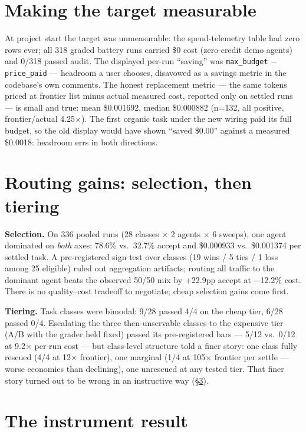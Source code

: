 \documentclass{article}
\begin{document}
\section{Making the target measurable}

At project start the target was unmeasurable: the spend-telemetry table had zero rows ever; all 318 graded battery runs carried \$0 cost (zero-credit demo agents) and 0/318 passed audit. The displayed per-run ``saving'' was \texttt{max\_budget} $-$ \texttt{price\_paid} --- headroom a user chooses, disavowed as a savings metric in the codebase's own comments. The honest replacement metric --- the same tokens priced at frontier list minus actual measured cost, reported only on settled runs --- is small and true: mean \$0.001692, median \$0.000882 (n=132, all positive, frontier/actual 4.25$\times$). The first organic task under the new wiring paid its full budget, so the old display would have shown ``saved \$0.00'' against a measured \$0.0018: headroom errs in both directions.

\section{Routing gains: selection, then tiering}

\textbf{Selection.} On 336 pooled runs (28 classes $\times$ 2 agents $\times$ 6 sweeps), one agent dominated on \emph{both} axes: 78.6\% vs.\ 32.7\% accept and \$0.000933 vs.\ \$0.001374 per settled task. A pre-registered sign test over classes (19 wins / 5 ties / 1 loss among 25 eligible) ruled out aggregation artifacts; routing all traffic to the dominant agent beats the observed 50/50 mix by +22.9pp accept at $-$12.2\% cost. There is no quality--cost tradeoff to negotiate; cheap selection gains come first.

\textbf{Tiering.} Task classes were bimodal: 9/28 passed 4/4 on the cheap tier, 6/28 passed 0/4. Escalating the three then-unservable classes to the expensive tier (A/B with the grader held fixed) passed its pre-registered bars --- 5/12 vs.\ 0/12 at 9.2$\times$ per-run cost --- but class-level structure told a finer story: one class fully rescued (4/4 at 12$\times$ frontier), one marginal (1/4 at 105$\times$ frontier per settle --- worse economics than declining), one unrescued at any tested tier. That finer story turned out to be wrong in an instructive way (\S\ref{sec:instrument}).

\section{The instrument result}
\label{sec:instrument}
\end{document}
